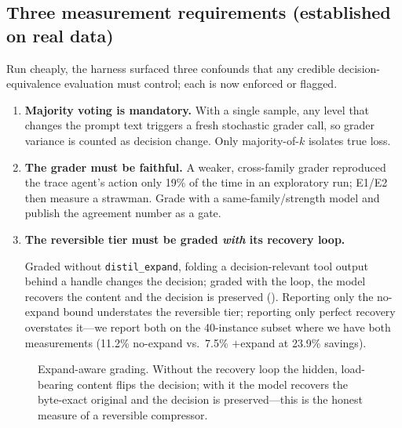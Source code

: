\documentclass{article}
\begin{document}
\subsection{Three measurement requirements (established on real data)}
Run cheaply, the harness surfaced three confounds that any credible
decision-equivalence evaluation must control; each is now enforced or flagged.
\begin{enumerate}
  \item \textbf{Majority voting is mandatory.} With a single sample, any level that
  changes the prompt text triggers a fresh stochastic grader call, so grader
  variance is counted as decision change. Only majority-of-$k$ isolates true loss.
  \item \textbf{The grader must be faithful.} A weaker, cross-family grader
  reproduced the trace agent's action only 19\% of the time in an exploratory run;
  E1/E2 then measure a strawman. Grade with a same-family/strength model and publish
  the agreement number as a gate.
  \item \textbf{The reversible tier must be graded \emph{with} its recovery loop.}
  {\sloppy
  Graded without \texttt{distil\_expand}, folding a decision-relevant tool output
  behind a handle changes the decision; graded with the loop, the model recovers the
  content and the decision is preserved (). Reporting only the
  no-expand bound understates the reversible tier; reporting only perfect recovery
  overstates it---we report both on the 40-instance subset where we have both
  measurements (11.2\% no-expand vs.\ 7.5\% $+$expand at 23.9\% savings).\par}
\end{enumerate}

\begin{figure}[t]
\centering
{}
\caption{Expand-aware grading. Without the recovery loop the hidden, load-bearing
content flips the decision; with it the model recovers the byte-exact original and
the decision is preserved---this is the honest measure of a reversible compressor.}
\label{fig:expand}
\end{figure}
\end{document}
